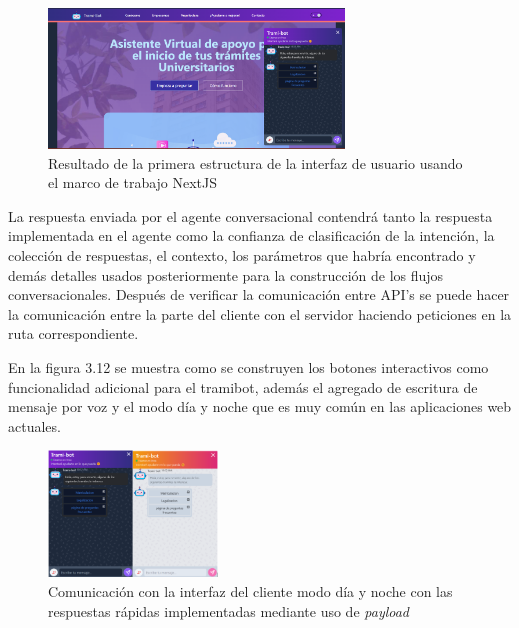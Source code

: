 \documentclass[letter, openright, 12pt]{book}
\begin{document}
\begin{figure}[H]
\centering
\includegraphics[width=0.7\textwidth]{figura3_12}
 \caption{Resultado de la primera estructura de la interfaz de usuario usando el marco de trabajo NextJS}
\label{fig:figura3_12}
\end{figure}

La respuesta enviada por el agente conversacional contendrá tanto la respuesta implementada en el agente como la confianza de clasificación de la intención, la colección de respuestas, el contexto, los parámetros que habría encontrado y demás detalles usados posteriormente para la construcción de los flujos conversacionales. 
Después de verificar la comunicación entre API’s se puede hacer la comunicación entre la parte del cliente con el servidor haciendo peticiones en la ruta correspondiente. 
\par
En la figura 3.12 se muestra como se construyen los botones interactivos como funcionalidad adicional para el tramibot, además el agregado de escritura de mensaje por voz y el modo día y noche que es muy común en las aplicaciones web actuales. 

\begin{figure}[H]
\centering
\includegraphics[width=0.4\textwidth]{figura3_13}
 \caption{Comunicación con la interfaz del cliente modo día y noche con las respuestas rápidas implementadas mediante uso de {\it payload}}
\label{fig:figura3_13}
\end{figure}
\end{document}

